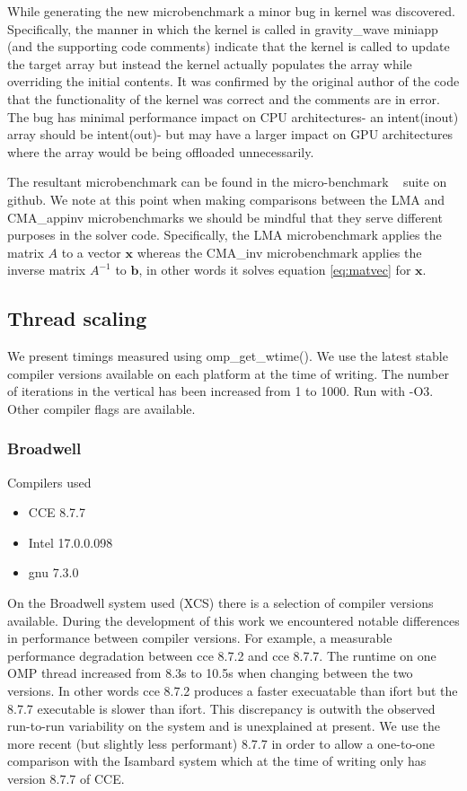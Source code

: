 While generating the new microbenchmark a minor bug in kernel was discovered.
Specifically, the manner in which the kernel is called in gravity\_wave miniapp (and the supporting code comments) indicate that the kernel is called to update the target array but instead the kernel actually populates the array while overriding the initial contents.
It was confirmed by the original author of the code that the functionality of the kernel was correct and the comments are in error.
The bug has minimal performance impact on CPU architectures- an intent(inout) array should be intent(out)- but may have a larger impact on GPU architectures where the array would be being offloaded unnecessarily. 

The resultant microbenchmark can be found in the micro-benchmark ~\cite{lfric-microbenchmarks} suite on github.
We note at this point when making comparisons between the LMA and CMA\_appinv microbenchmarks we should be mindful that they serve different purposes in the solver code.
Specifically, the LMA microbenchmark applies the matrix $A$ to a vector $\mathbf{x}$ whereas the CMA\_inv microbenchmark applies the inverse matrix $A^{-1}$ to $\mathbf{b}$, in other words it solves equation \ref{eq:matvec} for $\mathbf{x}$.

\subsection{Thread scaling}
We present timings measured using omp\_get\_wtime().
We use the latest stable compiler versions available on each platform at the time of writing.
The number of iterations in the vertical has been increased from 1 to 1000.
Run with -O3. Other compiler flags are available.
\subsubsection{Broadwell}
Compilers used

\begin{itemize}
\item CCE 8.7.7
\item Intel 17.0.0.098
\item gnu 7.3.0
\end{itemize}

On the Broadwell system used (XCS) there is a selection of compiler versions available.
During the development of this work we encountered notable differences in performance between compiler versions.
For example, a measurable performance degradation between cce 8.7.2 and cce 8.7.7.
The runtime on one OMP thread increased from 8.3s to 10.5s when changing between the two versions.
In other words cce 8.7.2 produces a faster execuatable than ifort but the 8.7.7 executable is slower than ifort.
This discrepancy is outwith the observed run-to-run variability on the system and is unexplained at present.
We use the more recent (but slightly less performant) 8.7.7 in order to allow a one-to-one comparison with the Isambard system which at the time of writing only has version 8.7.7 of CCE.

